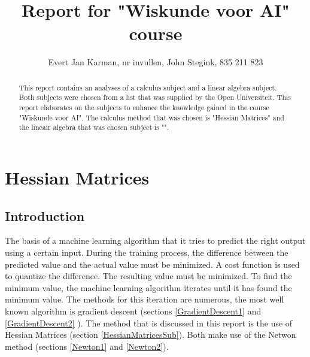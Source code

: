 \documentclass[journal]{IEEEtran}
\title{Report for "Wiskunde voor AI" course}
\author{
Evert Jan Karman, nr invullen, %
John Stegink,  835 211 823
}%
\begin{document}
\maketitle


\begin{abstract}
This report contains an analyses of a calculus subject and a linear algebra subject. Both subjects were chosen from a list that was supplied by the Open Universiteit. This report elaborates on the subjects to enhance the knowledge gained in the course "Wiskunde voor AI". The calculus method that was chosen is "Hessian Matrices" and the lineair algebra that was chosen subject is "".
\end{abstract}


\section{Hessian Matrices}
\label{HessianMatrices}

\subsection{Introduction}
The basis of a machine learning algorithm that it tries to predict the right output using a certain input. During the training process, the difference between the predicted value and the actual value must be minimized. A cost function is used to quantize the difference. The resulting value must be minimized. To find the minimum value, the machine learning algorithm iterates until it has found the minimum value. The methods for this iteration are numerous, the most well known algorithm is gradient descent (sections \ref{GradientDescent1} and \ref{GradientDescent2} ). The method that is discussed in this report is the use of Hessian Matrices (section \ref{HessianMatricesSub}). Both make use of the Netwon method (sections \ref{Newton1} and \ref{Newton2}).
\end{document}
